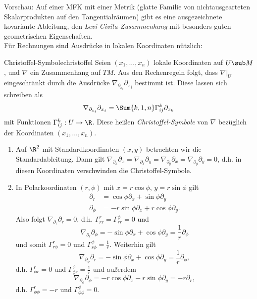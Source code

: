 Vorschau: Auf einer MFK mit einer Metrik (glatte Familie von nichtausgearteten Skalarprodukten auf den Tangentialräumen) gibt es eine ausgezeichnete kovariante Ableitung, den \textit{Levi-Civita-Zusammenhang} mit besonders guten geometrischen Eigenschaften.\\
Für Rechnungen sind Ausdrücke in lokalen Koordinaten nützlich:
\begin{satz}{Christoffel-Symbole}{christoffel}
Seien $(x_1, \dots, x_n)$ lokale Koordinaten auf $U \sub M$, und $\nabla$ ein Zusammenhang auf $TM$. Aus den Rechenregeln folgt, dass $\nabla|_U$ eingeschränkt durch die Ausdrücke $\nabla_{\partial_{x_i}} \partial_{x_j}$ bestimmt ist. Diese lassen sich schreiben als 
\begin{equation}
\nabla_{\partial_{x_i}} \partial_{x_j}  = \Sum{k,1,n} \Gamma_{ij}^k \partial_{x_k}
\end{equation}
mit Funktionen $\Gamma_{ij}^k: U \to \R$. Diese heißen \textit{Christoffel-Symbole} von $\nabla$ bezüglich der Koordinaten $(x_1, \dots, x_n)$.
\end{satz}
\begin{beispiele}
\begin{enumerate}
\item Auf $\R^2$ mit Standardkoordinaten $(x,y)$ betrachten wir die Standardableitung. Dann gilt $\nabla_{\partial_x} \partial_x = \nabla_{\partial_x}\partial_y = \nabla_{\partial_y}\partial_x = \nabla_{\partial_y} \partial_y = 0$, d.h. in diesen Koordinaten verschwinden die Christoffel-Symbole. 
\item In Polarkoordinaten $(r, \phi)$ mit $x = r \cos \phi$, $y=r \sin \phi$ gilt
\begin{align}
\partial_r &= \cos \phi \partial_x + \sin \phi \partial_y \\
\partial_\phi &= -r \sin \phi \partial_x + r \cos \phi \partial_y.
\end{align}
Also folgt $\nabla_{\partial_r} \partial_r = 0$, d.h. $\Gamma_{rr}^r = \Gamma_{rr}^\phi = 0$ und
\begin{equation}
\nabla_{\partial_r} \partial_\phi = - \sin \phi \partial_x + \cos \phi \partial_y = \frac{1}{r} \partial_\phi
\end{equation}
und somit $\Gamma_{r \phi}^r = 0$ und $\Gamma_{r \phi}^\phi = \frac{1}{r}$. Weiterhin gilt
\begin{equation}
\nabla_{\partial_\phi} \partial_r = - \sin \phi \partial_x + \cos \phi \partial_y = \frac{1}{r} \partial_\phi,
\end{equation}
d.h. $\Gamma_{\phi r}^r = 0$ und $\Gamma_{\phi r}^\phi = \frac{1}{r}$ und außerdem
\begin{equation}
\nabla_{\partial_\phi} \partial_\phi = - r \cos \phi \partial_x - r \sin \phi \partial_y = -r \partial_r,
\end{equation}
d.h. $\Gamma_{\phi \phi}^r = -r$ und $\Gamma_{\phi \phi}^\phi = 0$.
\end{enumerate}
\end{beispiele}

